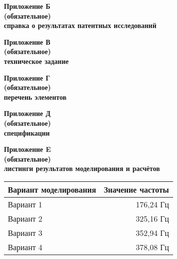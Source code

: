 \begin{center}
\textbf{Приложение Б}\\
\textbf{(обязательное)}\\
\textbf{справка о результатах патентных исследований}
\end{center}
\newpage
 

\begin{center}
  \textbf{Приложение В}\\
  \textbf{(обязательное)}\\
  \textbf{техническое задание}
\end{center}
\newpage

\begin{center}
  \textbf{Приложение Г}\\
  \textbf{(обязательное)}\\
  \textbf{перечень элементов}
\end{center}
\newpage

\begin{center}
  \textbf{Приложение Д}\\
  \textbf{(обязательное)}\\
  \textbf{спецификации}
\end{center}
\newpage

\begin{center}
  \textbf{Приложение E}\\
  \textbf{(обязательное)}\\
  \textbf{листинги результатов моделирования и расчётов}
\end{center}

\begin{table}[H]
  \centering
  \begin{tabular}{|l | r |}
    \hline
    Вариант моделирования & Значение частоты \\ \hline
    Вариант 1 & 176,24 Гц\\ \hline
    Вариант 2 & 325,16 Гц\\ \hline
    Вариант 3 & 352,94 Гц \\ \hline
    Вариант 4 & 378,08 Гц \\ \hline
  \end{tabular}
\end{table}


